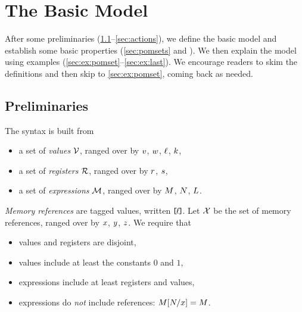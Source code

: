 \section{The Basic Model}
\label{sec:model}

After some preliminaries (\textsection\ref{sec:prelim}--\ref{sec:actions}),
we define the basic model and establish some basic properties
(\textsection\ref{sec:pomsets} and ).  We then explain the
model using examples (\textsection\ref{sec:ex:pomset}--\ref{sec:ex:last}).
We encourage readers to skim the definitions and then skip to
\textsection\ref{sec:ex:pomset}, coming back as needed.




\subsection{Preliminaries}
\label{sec:prelim}
The syntax is built from
\begin{itemize}
\item a set of \emph{values} $\mathcal{V}$, ranged over by
  $v$, $w$, $\ell$, $k$,
\item a set of \emph{registers} $\mathcal{R}$, ranged over by
  $r$, $s$,
\item a set of \emph{expressions} $\mathcal{M}$, ranged over by
  $M$, $N$,  $L$.
\end{itemize}

\emph{Memory references} are tagged values, written $\mkern-2mu\texttt{[}\mkern-2mu\ell \mkern-2mu\texttt{]}\mkern-2mu$.  Let $\mathcal{X}$
be the set of memory references, ranged over by $x$, $y$, $z$.
% 
We require that
\begin{itemize}
\item values and registers are disjoint, 
\item values include at least the constants $0$ and $1$,  
\item expressions include at least registers and values, 
\item expressions do \emph{not} include references: $M[N/x]=M$.
\end{itemize}

